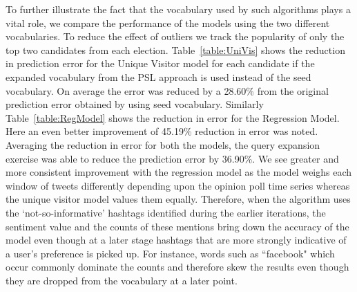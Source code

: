 To further illustrate the fact that the vocabulary used by such algorithms plays a vital role, we compare the performance of the models using the two different vocabularies.
To reduce the effect of outliers we track the popularity of only the top two candidates from each election.
Table~\ref{table:UniVis} shows the reduction in prediction error for the Unique Visitor model for each candidate if the expanded vocabulary from the PSL approach is used instead of the seed vocabulary.
On average the error was reduced by a 28.60\% from the original prediction error obtained by using seed vocabulary.
Similarly Table~\ref{table:RegModel} shows the reduction in error for the Regression Model.
Here an even better improvement of 45.19\% reduction in error was noted.
Averaging the reduction in error for both the models, the query expansion exercise was able to reduce the prediction error by  36.90\%.
We see greater and more consistent improvement with the regression model as the model weighs each window of tweets differently 
depending upon the opinion poll time series whereas the unique visitor model values them equally. 
Therefore, when the algorithm uses the `not-so-informative' hashtags identified during 
the earlier iterations, the sentiment value and the counts of these mentions bring down the accuracy of the model even though 
at a later stage hashtags that are more strongly indicative of a user's preference is picked up.
For instance, words such as ``facebook" which occur commonly dominate the counts and therefore skew the 
results even though they are dropped from the vocabulary at a later point.
